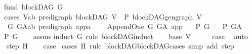 \begin{isabellebody}
\ \ \ fund{\isacharcolon}{\kern0pt}\ {\isachardoublequoteopen}blockDAG\ G{\isachardoublequoteclose}\isanewline
\ \ \ cases{\isacharcolon}{\kern0pt}\ {\isachardoublequoteopen}{\isasymAnd}V{\isacharcolon}{\kern0pt}{\isacharcolon}{\kern0pt}{\isacharparenleft}{\kern0pt}{\isacharprime}{\kern0pt}a{\isacharcomma}{\kern0pt}{\isacharprime}{\kern0pt}b{\isacharparenright}{\kern0pt}\ pre{\isacharunderscore}{\kern0pt}digraph{\isachardot}{\kern0pt}\ blockDAG\ V\ {\isasymLongrightarrow}\ P\ {\isacharparenleft}{\kern0pt}blockDAG{\isachardot}{\kern0pt}gen{\isacharunderscore}{\kern0pt}graph\ V{\isacharparenright}{\kern0pt}{\isachardoublequoteclose}\isanewline
\ \ \ \ {\isachardoublequoteopen}{\isasymAnd}G\ G{\isacharunderscore}{\kern0pt}A{\isacharcolon}{\kern0pt}{\isacharcolon}{\kern0pt}{\isacharparenleft}{\kern0pt}{\isacharprime}{\kern0pt}a{\isacharcomma}{\kern0pt}{\isacharprime}{\kern0pt}b{\isacharparenright}{\kern0pt}\ pre{\isacharunderscore}{\kern0pt}digraph{\isachardot}{\kern0pt}\ {\isasymAnd}app{\isacharcolon}{\kern0pt}{\isacharcolon}{\kern0pt}{\isacharprime}{\kern0pt}a{\isachardot}{\kern0pt}\ \isanewline
\ \ \ Append{\isacharunderscore}{\kern0pt}One\ G\ G{\isacharunderscore}{\kern0pt}A\ app\isanewline
\ \ {\isasymLongrightarrow}\ {\isacharparenleft}{\kern0pt}P\ G{\isacharparenright}{\kern0pt}\isanewline
\ \ {\isasymLongrightarrow}\ P\ G{\isacharunderscore}{\kern0pt}A{\isachardoublequoteclose}\isanewline
\ \ \ {\isachardoublequoteopen}P\ G{\isachardoublequoteclose}\isanewline
%
\isadelimproof
\ \ %
\endisadelimproof
%
\isatagproof
{}\isamarkupfalse%
\ assms\isanewline
{}\isamarkupfalse%
{\isacharparenleft}{\kern0pt}induct\ G\ rule{\isacharcolon}{\kern0pt}\ blockDAG{\isacharunderscore}{\kern0pt}induct{\isacharparenright}{\kern0pt}\isanewline
\ \ \isamarkupfalse%
\ {\isacharparenleft}{\kern0pt}base\ V{\isacharparenright}{\kern0pt}\isanewline
\ \ \isamarkupfalse%
\ \isamarkupfalse%
\ {\isacharquery}{\kern0pt}case\ \isamarkupfalse%
\ auto\isanewline
{}\isamarkupfalse%
\isanewline
\ \ \isamarkupfalse%
\ {\isacharparenleft}{\kern0pt}step\ H{\isacharparenright}{\kern0pt}\isanewline
\ \ \isamarkupfalse%
\ {\isacharquery}{\kern0pt}case\ \isamarkupfalse%
{\isacharparenleft}{\kern0pt}cases\ H\ rule{\isacharcolon}{\kern0pt}\ blockDAG{\isachardot}{\kern0pt}blockDAG{\isacharunderscore}{\kern0pt}cases{}{\isacharcomma}{\kern0pt}\ simp\ add{\isacharcolon}{\kern0pt}\ step{\isacharparenright}{\kern0pt}\isanewline

\end{isabellebody}
